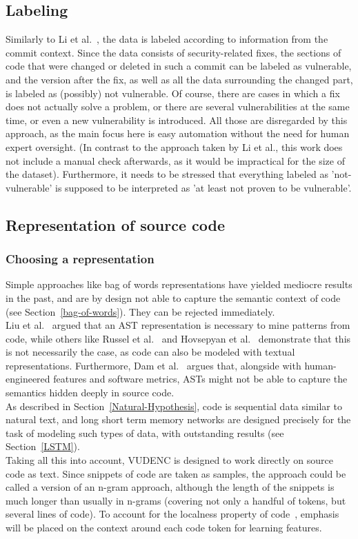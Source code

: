 \documentclass[
a4paper,
pagesize,
pdftex,
12pt,
ngerman,
fleqn,
final,
]{scrartcl}
\begin{document}
	
	\subsection{Labeling}
	Similarly to Li et al.~\cite{Li.2018}, the data is labeled according to information from the commit context. Since the data consists of security-related fixes, the sections of code that were changed or deleted in such a commit can be labeled as vulnerable, and the version after the fix, as well as all the data surrounding the changed part, is labeled as (possibly) not vulnerable. Of course, there are cases in which a fix does not actually solve a problem, or there are several vulnerabilities at the same time, or even a new vulnerability is introduced. All those are disregarded by this approach, as the main focus here is easy automation without the need for human expert oversight. (In contrast to the approach taken by Li et al., this work does not include a manual check afterwards, as it would be impractical for the size of the dataset). Furthermore, it needs to be stressed that everything labeled as 'not-vulnerable' is supposed to be interpreted as 'at least not proven to be vulnerable'.
	
	\subsection{Representation of source code}
	
	\subsubsection{Choosing a representation}
	Simple approaches like bag of words representations have yielded mediocre results in the past, and are by design not able to capture the semantic context of code (see Section~\ref{bag-of-words}). They can be rejected immediately.\\
	Liu et al.~\cite{Liu.2018} argued that an AST representation is necessary to mine patterns from code, while others like Russel et al.~\cite{Russell.2018} and Hovsepyan et al.~\cite{Hovsepyan.2012} demonstrate that this is not necessarily the case, as code can also be modeled with textual representations. Furthermore, Dam et al.~\cite{Dam.2016} argues that, alongside with human-engineered features and software metrics, ASTs might not be able to capture the semantics hidden deeply in source code.\\
	As described in Section~\ref{Natural-Hypothesis}, code is sequential data similar to natural text, and long short term memory networks are designed precisely for the task of modeling such types of data, with outstanding results (see Section~\ref{LSTM}).\\
	Taking all this into account, VUDENC is designed to work directly on source code as text. Since snippets of code are taken as samples, the approach could be called a version of an n-gram approach, although the length of the snippets is much longer than usually in n-grams (covering not only a handful of tokens, but several lines of code). To account for the localness property of code~\cite{Tu.2014}, emphasis will be placed on the context around each code token for learning features.
	
\end{document}
